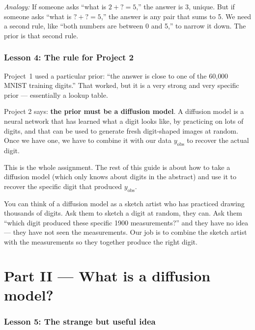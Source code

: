 \documentclass[11pt]{article}
\newcommand{\analogy}[1]{\par\smallskip\noindent\textit{Analogy:} #1\par\smallskip}
\begin{document}
\analogy{If someone asks ``what is $2 + ? = 5$,'' the answer is $3$,
unique. But if someone asks ``what is $? + ? = 5$,'' the answer is any
pair that sums to 5. We need a second rule, like ``both numbers are
between 0 and 5,'' to narrow it down. The prior is that second rule.}

\section{Lesson 4: The rule for Project 2}

Project~1 used a particular prior: ``the answer is close to one of the
60{,}000 MNIST training digits.'' That worked, but it is a very strong
and very specific prior --- essentially a lookup table.

Project 2 says: \textbf{the prior must be a diffusion model}. A diffusion
model is a neural network that has learned what a digit looks like, by
practicing on lots of digits, and that can be used to generate fresh
digit-shaped images at random. Once we have one, we have to combine it
with our data $y_{\text{obs}}$ to recover the actual digit.

This is the whole assignment. The rest of this guide is about how to
take a diffusion model (which only knows about digits in the abstract)
and use it to recover the specific digit that produced $y_{\text{obs}}$.

\begin{intuition}
You can think of a diffusion model as a sketch artist who has practiced
drawing thousands of digits. Ask them to sketch a digit at random, they
can. Ask them ``which digit produced these specific 1900
measurements?'' and they have no idea --- they have not seen the
measurements. Our job is to combine the sketch artist with the
measurements so they together produce the right digit.
\end{intuition}

\part*{Part II --- What is a diffusion model?}

\section{Lesson 5: The strange but useful idea}
\end{document}
